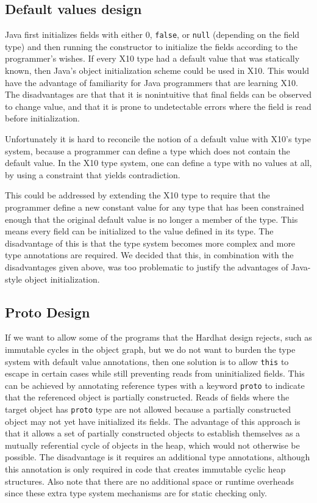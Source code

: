 

\subsection{Default values design}

Java first initializes fields with either $0$, \texttt{false}, or \texttt{null}
(depending on the field type) and then running the constructor to initialize
the fields according to the programmer's wishes.  If every X10 type had a
default value that was statically known, then Java's object initialization
scheme could be used in X10.  This would have the advantage of familiarity for
Java programmers that are learning X10.  The disadvantages are that that it is
nonintuitive that final fields can be observed to change value, and that it is
prone to undetectable errors where the field is read before initialization.

Unfortunately it is hard to reconcile the notion of a default value with X10's
type system, because a programmer can define a type which does not contain the
default value.  In the X10 type system, one can define a type with no values at
all, by using a constraint that yields contradiction.

This could be addressed by extending the X10 type to require that the
programmer define a new constant value for any type that has been constrained
enough that the original default value is no longer a member of the type.  This
means every field can be initialized to the value defined in its type.  The
disadvantage of this is that the type system becomes more complex and more type
annotations are required.  We decided that this, in combination with the
disadvantages given above, was too problematic to justify the advantages of
Java-style object initialization.

\subsection{Proto Design}

If we want to allow some of the programs that the Hardhat design rejects, such
as immutable cycles in the object graph, but we do not want to burden the type
system with default value annotations, then one solution is to allow
\texttt{this} to escape in certain cases while still preventing reads from
uninitialized fields.  This can be achieved by annotating reference types with
a keyword \texttt{proto} to indicate that the referenced object is partially
constructed.  Reads of fields where the target object has \texttt{proto} type
are not allowed because a partially constructed object may not yet have
initialized its fields.  The advantage of this approach is that it allows a set
of partially constructed objects to establish themselves as a mutually
referential cycle of objects in the heap, which would not otherwise be possible.
The disadvantage is it requires an additional type annotations, although this
annotation is only required in code that creates immutable cyclic heap
structures.  Also note that there are no additional space or runtime overheads
since these extra type system mechanisms are for static checking only.


